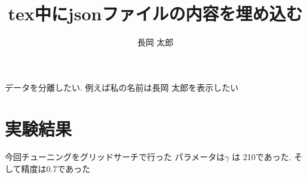 \documentclass[uplatex]{jsarticle}
\begin{document}
\title{tex中にjsonファイルの内容を埋め込む}
\author{
長岡 太郎
}
\maketitle

データを分離したい.
例えば私の名前は長岡 太郎を表示したい


\section{実験結果}
今回チューニングをグリッドサーチで行った
パラメータは$\gamma$ は 210であった.
そして精度は0.7であった
\end{document}
